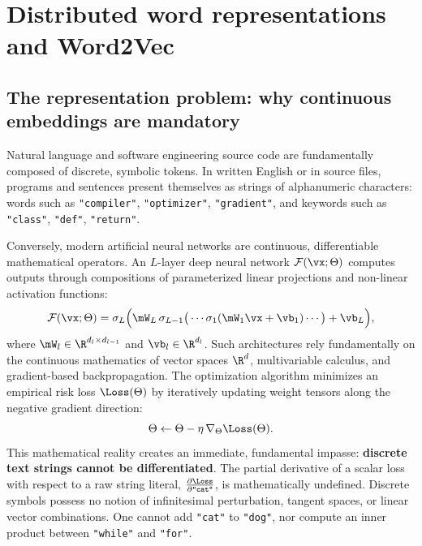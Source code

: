 \documentclass[../../main.tex]{subfiles}
\begin{document}
\chapter{Distributed word representations and Word2Vec}
\label{ch:word_embeddings}

\section{The representation problem: why continuous embeddings are mandatory}
\label{sec:representation_problem}

Natural language and software engineering source code are fundamentally composed of discrete, symbolic tokens. In written English or in source files, programs and sentences present themselves as strings of alphanumeric characters: words such as \texttt{"compiler"}, \texttt{"optimizer"}, \texttt{"gradient"}, and keywords such as \texttt{"class"}, \texttt{"def"}, \texttt{"return"}.

Conversely, modern artificial neural networks are continuous, differentiable mathematical operators. An $L$-layer deep neural network $\mathcal{F}(\vx; \Theta)$ computes outputs through compositions of parameterized linear projections and non-linear activation functions:
\begin{equation}
\label{eq:neural_operator}
\mathcal{F}(\vx; \Theta) = \sigma_L \Big( \mW_L \, \sigma_{L-1}\big( \cdots \sigma_1(\mW_1 \vx + \vb_1) \cdots \big) + \vb_L \Big),
\end{equation}
where $\mW_l \in \R^{d_l \times d_{l-1}}$ and $\vb_l \in \R^{d_l}$. Such architectures rely fundamentally on the continuous mathematics of vector spaces $\R^d$, multivariable calculus, and gradient-based backpropagation. The optimization algorithm minimizes an empirical risk loss $\Loss(\Theta)$ by iteratively updating weight tensors along the negative gradient direction:
\begin{equation}
\label{eq:gradient_update_rule}
\Theta \leftarrow \Theta - \eta \, \nabla_\Theta \Loss(\Theta).
\end{equation}
This mathematical reality creates an immediate, fundamental impasse: \textbf{discrete text strings cannot be differentiated}. The partial derivative of a scalar loss with respect to a raw string literal, $\frac{\partial \Loss}{\partial \text{\texttt{"cat"}}}$, is mathematically undefined. Discrete symbols possess no notion of infinitesimal perturbation, tangent spaces, or linear vector combinations. One cannot add \texttt{"cat"} to \texttt{"dog"}, nor compute an inner product between \texttt{"while"} and \texttt{"for"}.
\end{document}
